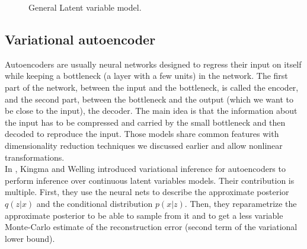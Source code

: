 \documentclass[letterpaper, twoside]{article}
\begin{document}
    \begin{figure}
    \centering
    \caption{General Latent variable model.}
    \label{latentvargraph}
    \end{figure}



  \subsection{Variational autoencoder}
    Autoencoders are usually neural networks designed to regress their input on itself while keeping a bottleneck (a layer with a few units) in the network. The first part of the network, between the input and the bottleneck, is called the encoder, and the second part, between the bottleneck and the output (which we want to be close to the input), the decoder. The main idea is that the information about the input has to be compressed and carried by the small bottleneck and then decoded to reproduce the input. Those models share common features with dimensionality reduction techniques we discussed earlier and allow nonlinear transformations.\\

    In \cite{Kingma.aevb}, Kingma and Welling introduced variational inference for autoencoders to perform inference over continuous latent variables models. Their contribution is multiple. First, they use the neural nets to describe the approximate posterior $q(z|x)$ and the conditional distribution $p(x|z)$. Then, they reparametrize the approximate posterior to be able to sample from it and to get a less variable Monte-Carlo estimate of the reconstruction error (second term of the variational lower bound).\\
\end{document}
